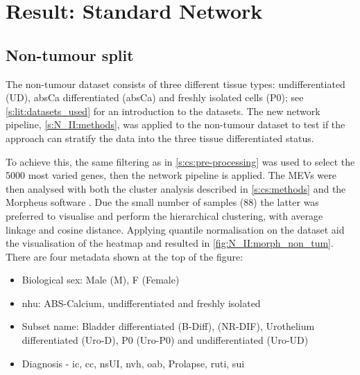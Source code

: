 \section{Result: Standard Network}  \label{s:N_II:std_net}

\vspace{3mm}
\vspace{3mm}

\subsection{Non-tumour split} \label{s:N_II:std}

The non-tumour dataset consists of three different tissue types: undifferentiated (UD), \acrshort{absCa} differentiated (\acrshort{absCa}) and freshly isolated cells (P0); see \cref{s:lit:datasets_used} for an introduction to the datasets. The new network pipeline, \cref{s:N_II:methods}, was applied to the non-tumour dataset to test if the approach can stratify the data into the three tissue differentiated status.

To achieve this, the same filtering as in \cref{s:cs:pre-processing} was used to select the 5000 most varied genes, then the network pipeline is applied. The MEVs were then analysed with both the cluster analysis described in \cref{s:cs:methods} and the Morpheus software \citep{Broad-InstituteUnknown-kn}. Due the small number of samples (88) the latter was preferred to visualise and perform the hierarchical clustering, with average linkage and cosine distance. Applying quantile normalisation on the dataset aid the visualisation of the heatmap and resulted in \cref{fig:N_II:morph_non_tum}. There are four metadata shown at the top of the figure: 
\begin{itemize}
    \item Biological sex: Male (M), F (Female)
    \item \acrfull{nhu}: ABS-Calcium, undifferentiated and freshly isolated
    \item Subset name: Bladder differentiated (B-Diff), (NR-DIF), Urothelium differentiated (Uro-D), P0 (Uro-P0) and undifferentiated (Uro-UD)
    \item Diagnosis - \acrfull{ic}, \acrfull{cc}, \acrfull{nsUI},  \acrfull{nvh}, \acrfull{oab}, Prolapse, \acrfull{ruti}, \acrfull{sui}
\end{itemize} 

